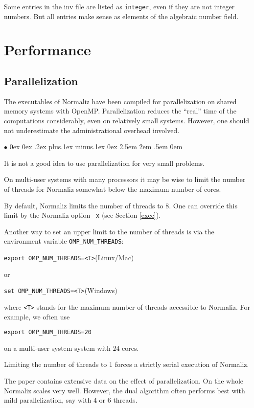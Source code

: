 \documentclass[12pt,a4paper]{scrartcl}
\newcommand{\stdli}{ \topsep0ex \partopsep0ex %
\parsep.2ex plus.1ex minus.1ex \itemsep0ex%
\leftmargin2.5em \labelwidth2em \labelsep.5em \rightmargin0em}%
\renewenvironment{itemize}{\begin{list}{{$\bullet$}}{\stdli}}{\end{list}}
\theoremstyle{definition}
\def\ttt{\texttt}
\begin{document}
Some entries in the inv file are listed as \ttt{integer}, even if they are not integer numbers. But all entries make sense as elements of the algebraic number field.

\section{Performance}\label{Perf}

\subsection{Parallelization}\label{PerfPar}

The executables of Normaliz have been compiled for parallelization
on shared memory systems with OpenMP. Parallelization reduces the
``real'' time of the computations considerably, even on relatively
small systems. However, one should not underestimate the
administrational overhead involved.
\begin{itemize}
	\item It is not a good idea to use parallelization for very small problems.
	\item On multi-user systems with many processors it may be wise to limit
	the number of threads for Normaliz somewhat below the maximum
	number of cores.
\end{itemize}
By default, Normaliz limits the number of threads to 8. One can override this limit by the Normaliz
option \ttt{-x} (see Section \ref{exec}).

Another way to set an upper limit to the number of threads is via the environment variable \verb|OMP_NUM_THREADS|:
\begin{center}
	\verb+export OMP_NUM_THREADS=<T>+\qquad (Linux/Mac)
\end{center}
or
\begin{center}
	\verb+set OMP_NUM_THREADS=<T>+\qquad (Windows)
\end{center}
where \ttt{<T>} stands for the maximum number of threads
accessible to Normaliz. For example, we often use
\begin{center}
	\verb+export OMP_NUM_THREADS=20+
\end{center}
on a multi-user system system with $24$ cores.

Limiting the number of threads to $1$ forces a strictly serial
execution of Normaliz.

The paper \cite{BIS} contains extensive data on the effect of parallelization. On the whole Normaliz scales very well.
However, the dual algorithm often performs best with mild parallelization, say with $4$ or $6$ threads.
\end{document}
